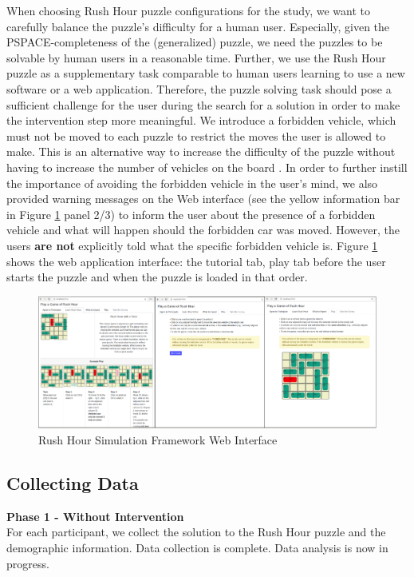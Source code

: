 \documentclass[doctor]{thesis} %
\theoremstyle{plain}
\begin{document}
When choosing Rush Hour puzzle configurations for the study, we want to carefully balance the puzzle's difficulty for a human user. Especially, given the PSPACE-completeness of the (generalized) puzzle, we need the puzzles to be solvable by human users in a reasonable time. Further, we use the Rush Hour puzzle as a supplementary task comparable to human users learning to use a new software or a web application. Therefore, the puzzle solving task should pose a sufficient challenge for the user during the search for a solution in order to make the intervention step more meaningful. We introduce a forbidden vehicle, which must not be moved to each puzzle to restrict the moves the user is allowed to make. This is an alternative way to increase the difficulty of the puzzle without having to increase the number of vehicles on the board \cite{fernau2003}. In order to further instill the importance of avoiding the forbidden vehicle in the user's mind, we also provided warning messages on the Web interface (see the yellow information bar in Figure \ref{fig:ui} panel 2/3) to inform the user about the presence of a forbidden vehicle and what will happen should the forbidden car was moved. However, the users \textbf{are not} explicitly told what the specific forbidden vehicle is.
Figure \ref{fig:ui} shows the web application interface: the tutorial tab, play tab before the user starts the puzzle and when the puzzle is loaded in that order.
\begin{figure}[!hbt]
  \centering
\includegraphics[width=\columnwidth]{img/UI.pdf}
  \caption{Rush Hour Simulation Framework Web Interface}
  \label{fig:ui}
\end{figure}



\subsection*{Collecting Data}
\textbf{Phase 1 - Without Intervention}\\
For each participant, we collect the solution to the Rush Hour puzzle and the demographic information. Data collection is complete. Data analysis is now in progress.
\end{document}
